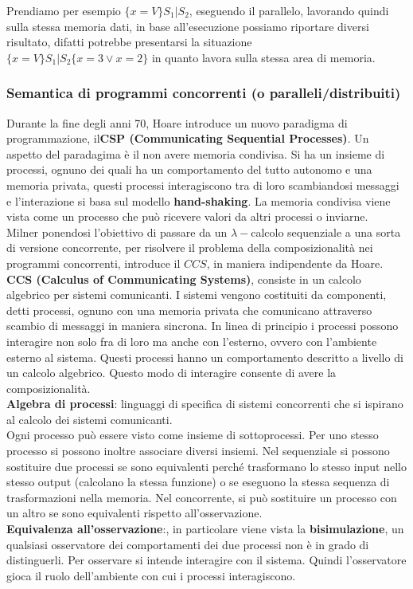 Prendiamo per esempio $\{x = V\} S_1 | S_2$, eseguendo il parallelo, lavorando quindi sulla stessa memoria dati, in base all'esecuzione possiamo riportare diversi risultato,  difatti potrebbe presentarsi la situazione \\ $\{x = V\} S_1 | S_2 \{x = 3 \lor x = 2\}$ in quanto lavora sulla stessa area di memoria.

\subsubsection{Semantica di programmi concorrenti (o paralleli/distribuiti)}
Durante la fine degli anni 70, Hoare introduce un nuovo paradigma di programmazione, il\textbf{CSP (Communicating Sequential Processes)}. Un aspetto del paradagima è il non avere memoria condivisa. Si ha un insieme di processi, ognuno dei quali ha un comportamento del tutto autonomo e una memoria privata, questi processi interagiscono tra di loro scambiandosi messaggi e l'interazione si basa sul modello \textbf{hand-shaking}.  La memoria condivisa viene vista come un processo che può ricevere valori da altri processi o inviarne. \\

Milner ponendosi l’obiettivo di passare da un $\lambda-$calcolo sequenziale a una sorta di versione concorrente, per risolvere il problema della composizionalità nei programmi concorrenti, introduce il $CCS$, in maniera indipendente da Hoare. \\
\textbf{CCS (Calculus of Communicating Systems)}, consiste in un calcolo algebrico per sistemi comunicanti. I sistemi vengono costituiti da componenti, detti processi, ognuno con una memoria privata che comunicano attraverso scambio di messaggi in maniera sincrona. In linea di principio i processi possono interagire non solo fra di loro ma anche con l’esterno, ovvero con l’ambiente esterno al sistema. Questi processi hanno un comportamento descritto a livello di un calcolo algebrico. Questo modo di interagire consente di avere la composizionalità. \\
\textbf{Algebra di processi}: linguaggi di specifica di sistemi concorrenti che si ispirano al calcolo dei sistemi comunicanti.  \\

Ogni processo può essere visto come insieme di sottoprocessi. Per uno stesso processo si possono inoltre associare diversi insiemi. Nel sequenziale si possono sostituire due processi se sono equivalenti perché trasformano lo stesso input nello stesso output (calcolano la stessa funzione) o se eseguono la stessa sequenza di trasformazioni nella memoria. Nel concorrente, si può sostituire un processo con un altro se sono equivalenti rispetto all’osservazione.  \\
\textbf{Equivalenza all’osservazione}:, in particolare viene vista la \textbf{bisimulazione}, un qualsiasi osservatore dei comportamenti dei due processi non è in grado di distinguerli. Per osservare si intende interagire con il sistema. Quindi l’osservatore gioca il ruolo dell’ambiente con cui i processi interagiscono.
